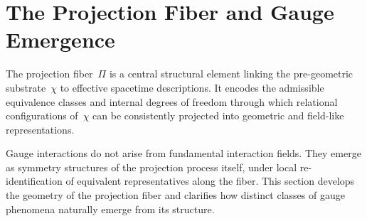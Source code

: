 \clearpage

\section{The Projection Fiber and Gauge Emergence}
\label{sec:projection-gauge}

The projection fiber~$\Pi$ is a central structural element linking the
pre-geometric substrate~$\chi$ to effective spacetime descriptions.
It encodes the admissible equivalence classes and internal degrees of
freedom through which relational configurations of~$\chi$ can be
consistently projected into geometric and field-like representations.

Gauge interactions do not arise from fundamental interaction fields.
They emerge as symmetry structures of the projection process itself,
under local re-identification of equivalent representatives along the
fiber.
This section develops the geometry of the projection fiber and clarifies
how distinct classes of gauge phenomena naturally emerge from its
structure.









